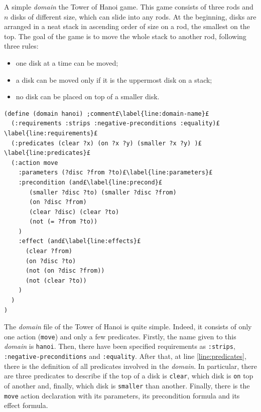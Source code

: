 \begin{example}\label{ex:pddl-domain}
A simple \PDDL \textit{domain} the Tower of Hanoi game. This game consists of three rods and $n$ disks of different size, which can slide into any rods. At the beginning, disks are arranged in a neat stack in ascending order of size on a rod, the smallest on the top. The goal of the game is to move the whole stack to another rod, following three rules:
\begin{itemize}
\item one disk at a time can be moved;
\item a disk can be moved only if it is the uppermost disk on a stack;
\item no disk can be placed on top of a smaller disk.
\end{itemize}
\begin{lstlisting}[language=PDDL, escapechar=£]
(define (domain hanoi) ;comment£\label{line:domain-name}£
  (:requirements :strips :negative-preconditions :equality)£\label{line:requirements}£
  (:predicates (clear ?x) (on ?x ?y) (smaller ?x ?y) )£\label{line:predicates}£
  (:action move
    :parameters (?disc ?from ?to)£\label{line:parameters}£
    :precondition (and£\label{line:precond}£
       (smaller ?disc ?to) (smaller ?disc ?from)
       (on ?disc ?from)
       (clear ?disc) (clear ?to)
       (not (= ?from ?to))
    )
    :effect (and£\label{line:effects}£
      (clear ?from)
      (on ?disc ?to)
      (not (on ?disc ?from))
      (not (clear ?to))
    )
  )
)
\end{lstlisting}
The \PDDL \textit{domain} file of the Tower of Hanoi is quite simple. Indeed, it consists of only one action (\texttt{move}) and only a few predicates. Firstly, the name given to this \textit{domain} is \texttt{hanoi}. Then, there have been specified requirements as \texttt{:strips}, \texttt{:negative-preconditions} and \texttt{:equality}. After that, at line \ref{line:predicates}, there is the definition of all predicates involved in the \PDDL \textit{domain}. In particular, there are three predicates to describe if the top of a disk is \texttt{clear}, which disk is \texttt{on} top of another and, finally, which disk is \texttt{smaller} than another. Finally, there is the \texttt{move} action declaration with its parameters, its precondition formula and its effect formula.
\end{example}
